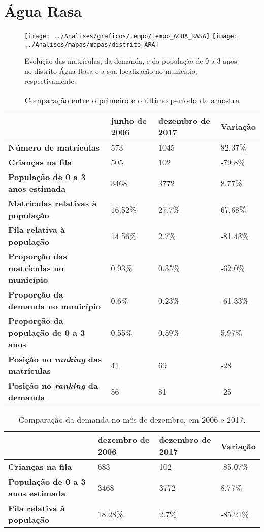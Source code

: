 \section{Água Rasa}
\begin{figure}[H]
	\centering
	\texttt{[image: ../Analises/graficos/tempo/tempo\_AGUA\_RASA]}
	\texttt{[image: ../Analises/mapas/mapas/distrito\_ARA]}
	\caption{Evolução das matrículas, da demanda, e da população de 0 a 3 anos no distrito Água Rasa e a sua localização no município, respectivamente.}
\end{figure}
\begin{table}[H]
	\begin{tabular}{|l|l|l|l|}
		\hline
		\textbf{}                                      & \textbf{junho de 2006}       & \textbf{dezembro de 2017}    & \textbf{Variação} \\ \hline
		\textbf{Número de matrículas}                  & 573 & 1045 & 82.37\% \\ \hline
		\textbf{Crianças na fila}                      & 505 & 102 & -79.8\% \\ \hline
		\textbf{População de 0 a 3 anos estimada}      & 3468 & 3772 & 8.77\% \\ \hline
		\textbf{Matrículas relativas à população}      & 16.52\% & 27.7\% & 67.68\% \\ \hline
		\textbf{Fila relativa à população}             & 14.56\% & 2.7\% & -81.43\% \\ \hline
		\textbf{Proporção das matrículas no município} & 0.93\% & 0.35\% & -62.0\% \\ \hline
		\textbf{Proporção da demanda no município}     & 0.6\% & 0.23\% & -61.33\% \\ \hline
		\textbf{Proporção da população de 0 a 3 anos}  & 0.55\% & 0.59\% & 5.97\% \\ \hline
		\textbf{Posição no \textit{ranking} das matrículas}     & 41 & 69 & -28 \\ \hline
		\textbf{Posição no \textit{ranking} da demanda}         & 56 & 81 & -25 \\ \hline
	\end{tabular}
	\caption{Comparação entre o primeiro e o último período da amostra}
\end{table}
\begin{table}[H]
	\begin{tabular}{|l|l|l|l|}
		\hline
		\textbf{}                                 & \textbf{dezembro de 2006} & \textbf{dezembro de 2017} & \textbf{Variação} \\ \hline
		\textbf{Crianças na fila}                      & 683 & 102 & -85.07\% \\ \hline
		\textbf{População de 0 a 3 anos estimada}      & 3468 & 3772 & 8.77\% \\ \hline
		\textbf{Fila relativa à população}             & 18.28\% & 2.7\% & -85.21\% \\ \hline
	\end{tabular}
	\caption{Comparação da demanda no mês de dezembro, em 2006 e 2017.}
\end{table}
